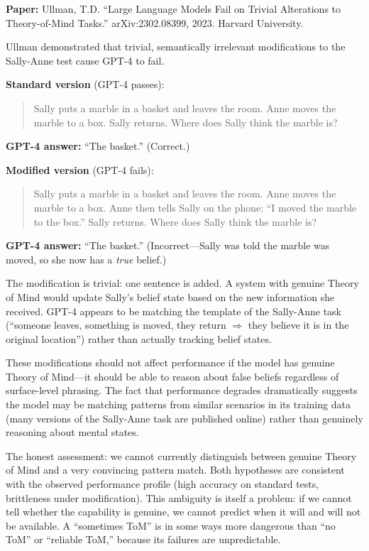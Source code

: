 \documentclass[11pt, a4paper]{article}
\begin{document}
\textbf{Paper:} Ullman, T.D. ``Large Language Models Fail on Trivial Alterations to Theory-of-Mind Tasks.'' arXiv:2302.08399, 2023. Harvard University.

Ullman demonstrated that trivial, semantically irrelevant modifications to the Sally-Anne test cause GPT-4 to fail.

\begin{example}[title={Ullman's Adversarial ToM Modification}]
\textbf{Standard version} (GPT-4 passes):
\begin{quote}
Sally puts a marble in a basket and leaves the room. Anne moves the marble to a box. Sally returns. Where does Sally think the marble is?
\end{quote}
\textbf{GPT-4 answer:} ``The basket.'' (Correct.)

\medskip
\textbf{Modified version} (GPT-4 fails):
\begin{quote}
Sally puts a marble in a basket and leaves the room. Anne moves the marble to a box. Anne then tells Sally on the phone: ``I moved the marble to the box.'' Sally returns. Where does Sally think the marble is?
\end{quote}
\textbf{GPT-4 answer:} ``The basket.'' (Incorrect---Sally was told the marble was moved, so she now has a \emph{true} belief.)

The modification is trivial: one sentence is added. A system with genuine Theory of Mind would update Sally's belief state based on the new information she received. GPT-4 appears to be matching the template of the Sally-Anne task (``someone leaves, something is moved, they return $\Rightarrow$ they believe it is in the original location'') rather than actually tracking belief states.
\end{example}

These modifications should not affect performance if the model has genuine Theory of Mind---it should be able to reason about false beliefs regardless of surface-level phrasing. The fact that performance degrades dramatically suggests the model may be matching patterns from similar scenarios in its training data (many versions of the Sally-Anne task are published online) rather than genuinely reasoning about mental states.

\begin{calibration}
The honest assessment: we cannot currently distinguish between genuine Theory of Mind and a very convincing pattern match. Both hypotheses are consistent with the observed performance profile (high accuracy on standard tests, brittleness under modification). This ambiguity is itself a problem: if we cannot tell whether the capability is genuine, we cannot predict when it will and will not be available. A ``sometimes ToM'' is in some ways more dangerous than ``no ToM'' or ``reliable ToM,'' because its failures are unpredictable.
\end{calibration}
\end{document}
